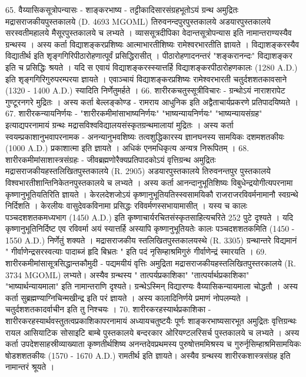 65. वैय्यासिकसूत्रोपन्यासः -
शाङ्करभाष्य - तट्टीकादिसारसंग्रहभूतोऽयं ग्रन्थ अमुद्रितः मद्रासराजकीयपुस्तकालये (D. 4693 MGOML) तिरुवनन्दपुरपुस्तकालये अडयारपुस्तकालये सरस्वतीमहालये मैसूरपुस्तकालये च लभ्यते । व्याससूत्रदीपिका वेदान्तसूत्रोपन्यास इति नामान्तराण्यस्यैव ग्रन्थस्य । अस्य कर्ता विद्याशङ्करप्रशिष्यः आत्माभारतीशिष्यः रामेश्वरभारतीति ज्ञायते । विद्याशङ्करस्यैव विद्यातीर्थ इति शृङ्गगिरिपीठारोहणात्पूर्वं प्रसिद्धिरासीत् । पीठारोहणादनन्तरं "शङ्करानन्दः" विद्याशङ्कर इति च प्रसिद्धिः श्रयते । यदि स एवायं विद्याशङ्करस्स्यात्तर्हि विद्याशङ्करपीठारोहणकालः (1280 A.D.) इति शृङ्गगिरिगुरुपरम्परया ज्ञायते । एवाञ्चायं विद्याशङ्करप्रशिष्यः रामेश्वरभारती चतुर्दशशतकावसाने (1320 - 1400 A.D.) स्यादिति निर्णेतुमर्हते । 
66. शारीरकचतुस्सूत्रीविचारः -
ग्रन्थोऽयं नाराशरापेट गुण्टूरनगरे मुद्रितः । अस्य कर्ता बेल्लङ्कोण्ड - रामराय आधुनिक इति अद्वैताचार्यप्रकरणे प्रतिपादयिष्यते । 
67. शारीरकन्यायनिर्णयः - 
"शारीरकमीमांसाभाष्यनिर्णयः" "भाष्यन्यायनिर्णयः" "भाष्यन्यायसंग्रह" इत्याद्यपरनामायं ग्रन्थः मद्रासविश्वविद्यालयसंस्कृतग्रन्थमालायां मुद्रितः । अस्य कर्ता स्वयम्प्रकाशानुभवापरनामक - अनन्यानुभवशिष्यः तत्वशुद्धिकारस्य ज्ञानघनस्य सामयिकः दशमशतकीयः (1000 A.D.) प्रकाशात्मा इति ज्ञायते । अधिकं एनमधिकृत्य अन्यत्र निरूपितम् ।
68. शारीरकमीमांसाशास्त्रसंग्रहः - 
जीवब्रह्मणोरैक्यप्रतिपादकोऽयं वृत्तिग्रन्थ अमुद्रितः मद्रासराजकीयहस्तलिखितपुस्तकालये (R. 2905) अडयारपुस्तकालये तिरुवनन्तपुर पुस्तकालये विश्वभारतीशान्तिनिकेतनपुस्तकालये च लभ्यते । अस्य कर्ता आनन्दानुभूतिशिष्यः विबुधेन्द्रयोगीत्यपरनामा कृष्णानुभूतियतिरिति ज्ञायते । केरलदेशजोऽयं कृष्णानुभूतियतिस्स्वसामयिकौ राजराजरविवर्मनामानौ स्वग्रन्थे निर्दिशति । केरलीयः वासुदेवकविनामा प्रसिद्धः रविवर्मणस्सभायामासीत् । यस्य च कालः पञ्चदशशतकमध्यभाग (1450 A.D.) इति कृष्णाचार्यरचितसंस्कृतसाहित्यचरिते 252 पुटे दृश्यते । यदि कृष्णानुभूतिनिर्दिष्ट एव रविवर्मा अयं स्यात्तर्हि अस्यापि कृष्णानुभूतियतेः कालः पञ्चदशशतकमिति (1450 - 1550 A.D.) निर्णेतुं शक्यते । मद्रासराजकीय स्तलिखितपुस्तकालयस्थे (R. 3305) ग्रन्थान्तरे विद्यमानं " गीर्वाणेन्द्रसरस्वत्याः पादाब्जं हृदि बिभ्रतः " इति पदं नृसिम्हाश्रमिगुरुं गीर्वाणेन्द्रं स्मारयति । 
69. शारीरकमीमांसासूत्रसिद्धान्तकौमुदी -
पद्यमयीयं वृत्तिः अमुद्रिता मद्रासराजकीयहस्तलिखितपुस्तरकालये (R. 3734 MGOML) लभ्यते। अस्यैव ग्रन्थस्य " तात्पर्यप्रकाशिका" "तात्पर्यार्थप्रकाशिका" "भाष्यार्थन्यायमाला" इति नामान्तराणि दृश्यते। ग्रन्थेऽस्मिन् विद्यारण्यः वैय्यासिकन्यायमाला चोद्धतौ । अस्य कर्ता सुब्रह्मण्याग्निचिन्मखीन्द्र इति परं ज्ञायते । अस्य कालादिनिर्णये प्रमाणं नोपलम्यते । चतुर्दशशतकादर्वाचीन इति तु निश्चयः ।
70. शारीरकरहस्यार्थप्रकाशिका -
शारीरकरहस्यार्थवस्तुतत्वप्रकाशिकापरनामायं अध्यायचतुष्टयैः पूर्णः शाङ्करभाष्यसारभूत अमुद्रितः वृत्तिग्रन्थः रायल आसियाटिक सोसाइटि बाम्बे पुस्तकालये बन्दरकार ओरियण्टलरिसर्च पुस्तकालये च लभ्यते । अस्य कर्ता उपदेशसाहस्रीव्याख्याता कृष्णतीर्थशिष्य अनन्तदेवप्रथमस्य पुरुषोत्तममिश्रस्य च गुरुर्नृसिम्हाश्रमिसामयिकः षोडशशतकीयः (1570 - 1670 A.D.) रामतीर्थ इति ज्ञायते। अस्यैव ग्रन्थस्य शारीरकशास्त्रसंग्रह इति नामान्तरं श्रूयते । 
